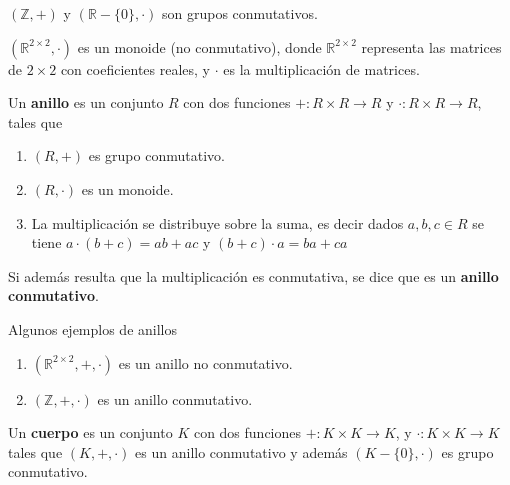 \begin{example}

$(\mathbb{Z}, +)$ y $(\mathbb{R} - \{0\}, \cdot)$ son grupos conmutativos.

$(\mathbb{R}^{2 \times 2}, \cdot)$ es un monoide (no conmutativo), donde $ \mathbb{R}^{2 \times 2}$ representa las matrices de $ 2 \times 2$ con coeficientes reales, y $ \cdot$ es la multiplicación de matrices.

\end{example}


\begin{definition}
Un \textbf{anillo} es un conjunto $R$ con dos funciones $ + : R \times R \to R$ y $\cdot : R \times R \to R$, tales que

\begin{enumerate}
\item $(R,+)$ es grupo conmutativo.

\item $(R,\cdot)$ es un monoide.

\item La multiplicación se distribuye sobre la suma, es decir dados $ a,b,c \in R$ se tiene $a \cdot (b + c) = ab + ac$ y $ (b+c) \cdot a = ba + ca$

\end{enumerate}

Si además resulta que la multiplicación es conmutativa, se dice que es un \textbf{anillo conmutativo}.

\end{definition}

\begin{example}

Algunos ejemplos de anillos

\begin{enumerate}

\item $ (\mathbb{R}^{2 \times 2}, +, \cdot)$ es un anillo no conmutativo.

\item $ (\mathbb{Z}, +, \cdot)$ es un anillo conmutativo.

\end{enumerate}
\end{example}

\begin{definition}

Un \textbf{cuerpo} es un conjunto $K$ con dos funciones $+ : K \times K \to K$, y $\cdot : K \times K \to K$ tales que $(K, +, \cdot)$ es un anillo conmutativo y además $(K-\{0\}, \cdot)$ es grupo conmutativo.

\end{definition}

